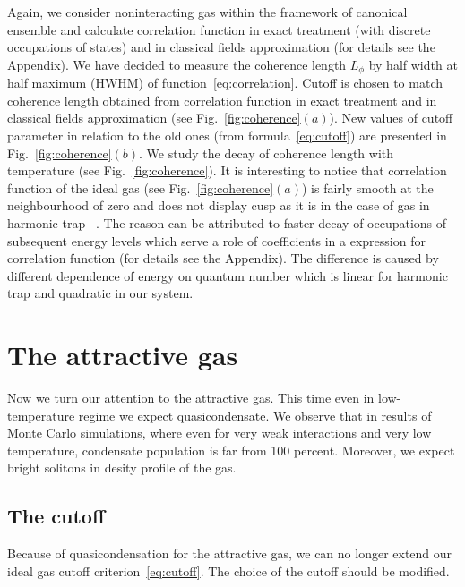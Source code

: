 \documentclass[aps,pra,reprint]{revtex4-2}
\begin{document}
Again, we consider noninteracting gas within the framework of canonical 
ensemble and calculate correlation function in exact treatment (with discrete 
occupations of states) and in classical fields approximation (for details see 
the Appendix). We have decided to measure the coherence length $L_{\phi}$ by 
half width at half maximum (HWHM) of function~\eqref{eq:correlation}. Cutoff is 
chosen to match coherence length obtained from correlation function in exact 
treatment and in classical fields approximation (see 
Fig.~\ref{fig:coherence}$(a)$). New values of cutoff parameter in relation to 
the old ones (from formula~\eqref{eq:cutoff}) are presented in 
Fig.~\ref{fig:coherence}$(b)$. We study the decay of coherence length with 
temperature (see Fig.~\ref{fig:coherence}).
It is interesting to notice that correlation function of the ideal gas (see 
Fig.~\ref{fig:coherence}$(a)$) is fairly smooth at the neighbourhood of zero 
and does not display cusp as it is in the case of gas in harmonic trap
~\cite{Kadio2005}. The reason can be attributed to faster decay of occupations 
of subsequent energy levels which serve a role of coefficients in a expression 
for correlation function (for details see the Appendix). The difference is 
caused by different dependence of energy on quantum number which is linear for 
harmonic trap and quadratic in our system.

\section{The attractive gas}\label{attractive}
Now we turn our attention to the attractive gas. This time even in 
low-temperature regime we expect quasicondensate. We observe that in results of 
Monte Carlo simulations, where even for very weak interactions and very low 
temperature, condensate population is far from 100 percent. Moreover, we expect 
bright solitons in desity profile of the gas.

\subsection{The cutoff}
Because of quasicondensation for the attractive gas, we can no longer extend 
our ideal gas cutoff criterion~\eqref{eq:cutoff}. The choice of the cutoff 
should be modified.
    
\end{document}
